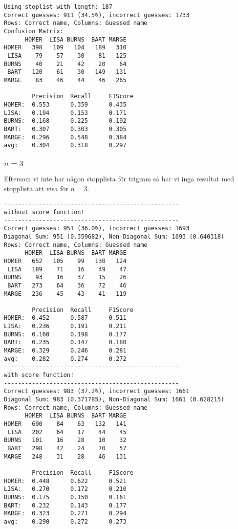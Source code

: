 \documentclass[a4paper]{article}
\begin{document}
\begin{verbatim}
Using stoplist with length: 187
Correct guesses: 911 (34.5%), incorrect guesses: 1733
Rows: Correct name, Columns: Guessed name
Confusion Matrix:
      HOMER  LISA BURNS  BART MARGE 
HOMER   398   109   104   189   310 
 LISA    79    57    30    81   125 
BURNS    40    21    42    20    64 
 BART   120    61    30   149   131 
MARGE    83    46    44    46   265 

        Precision  Recall     F1Score    
HOMER:  0.553      0.359      0.435      
LISA:   0.194      0.153      0.171      
BURNS:  0.168      0.225      0.192      
BART:   0.307      0.303      0.305      
MARGE:  0.296      0.548      0.384      
avg:    0.304      0.318      0.297      
\end{verbatim}

\subsubsection{$n=3$}
Eftersom vi inte har någon stopplista för trigram så har vi inga resultat med
stopplista att visa för $n=3$.
\begin{verbatim}
--------------------------------------------------
without score function!
--------------------------------------------------
Correct guesses: 951 (36.0%), incorrect guesses: 1693
Diagonal Sum: 951 (0.359682), Non-Diagonal Sum: 1693 (0.640318)
Rows: Correct name, Columns: Guessed name
      HOMER  LISA BURNS  BART MARGE 
HOMER   652   105    99   130   124 
 LISA   189    71    16    49    47 
BURNS    93    16    37    15    26 
 BART   273    64    36    72    46 
MARGE   236    45    43    41   119 

        Precision  Recall     F1Score    
HOMER:  0.452      0.587      0.511      
LISA:   0.236      0.191      0.211      
BURNS:  0.160      0.198      0.177      
BART:   0.235      0.147      0.180      
MARGE:  0.329      0.246      0.281      
avg:    0.282      0.274      0.272      
--------------------------------------------------
with score function!
--------------------------------------------------
Correct guesses: 983 (37.2%), incorrect guesses: 1661
Diagonal Sum: 983 (0.371785), Non-Diagonal Sum: 1661 (0.628215)
Rows: Correct name, Columns: Guessed name
      HOMER  LISA BURNS  BART MARGE 
HOMER   690    84    63   132   141 
 LISA   202    64    17    44    45 
BURNS   101    16    28    10    32 
 BART   298    42    24    70    57 
MARGE   248    31    28    46   131 

        Precision  Recall     F1Score    
HOMER:  0.448      0.622      0.521      
LISA:   0.270      0.172      0.210      
BURNS:  0.175      0.150      0.161      
BART:   0.232      0.143      0.177      
MARGE:  0.323      0.271      0.294      
avg:    0.290      0.272      0.273      
\end{verbatim}
\end{document}
